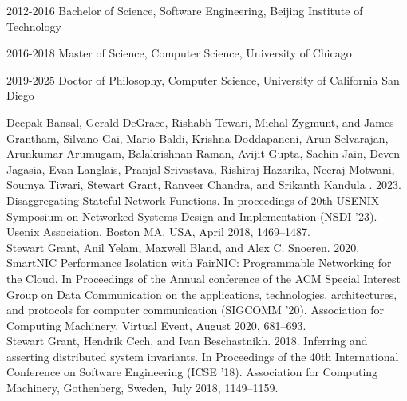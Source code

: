 \documentclass[12pt]{ucsddissertation}
\begin{document}
\begin{vita}
\noindent
\begin{cv}{}
\begin{cvlist}{}
\item[2012-2016] Bachelor of Science, Software Engineering, Beijing Institute of Technology
\item[2016-2018] Master of Science, Computer Science, University of Chicago
\item[2019-2025] Doctor of Philosophy, Computer Science, University of California San Diego
\end{cvlist}
\end{cv}

\publications

\noindent Deepak Bansal, Gerald DeGrace, Rishabh Tewari, Michal Zygmunt, and James Grantham, Silvano
Gai, Mario Baldi, Krishna Doddapaneni, Arun Selvarajan, Arunkumar Arumugam, Balakrishnan Raman,
Avijit Gupta, Sachin Jain, Deven Jagasia, Evan Langlais, Pranjal Srivastava, Rishiraj Hazarika,
Neeraj Motwani, Soumya Tiwari, Stewart Grant, Ranveer Chandra, and Srikanth Kandula . 2023.
Disaggregating Stateful Network Functions. In proceedings of 20th USENIX Symposium on Networked
Systems Design and Implementation (NSDI '23).  Usenix Association, Boston MA, USA, April 2018, 1469--1487. \\

\noindent Stewart Grant, Anil Yelam, Maxwell Bland, and Alex C. Snoeren. 2020. SmartNIC Performance
Isolation with FairNIC: Programmable Networking for the Cloud. In Proceedings of the Annual
conference of the ACM Special Interest Group on Data Communication on the applications,
technologies, architectures, and protocols for computer communication (SIGCOMM '20). Association for
Computing Machinery, Virtual Event, August 2020, 681–693.\\

\noindent Stewart Grant, Hendrik Cech, and Ivan Beschastnikh. 2018. Inferring and asserting
distributed system invariants. In Proceedings of the 40th International Conference on Software
Engineering (ICSE '18). Association for Computing Machinery, Gothenberg, Sweden, July 2018, 1149–1159.\\


\end{vita}
\end{document}
